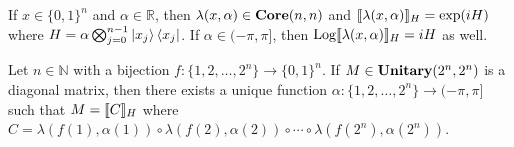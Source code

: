 \begin{theorem}
    \label{Thm:LambdaSem}
    If $x \in \{ 0, 1 \}^n$ and $\alpha \in \mathbb{R}$, then $\lambda( x, \alpha ) \in \mathbf{Core}( n,n )$ and $\llbracket\lambda( x, \alpha )\rrbracket_H = \exp( iH )$ where $H = \alpha \bigotimes_{j=0}^{n-1} \ket{x_j} \bra{x_j}$.
    If $\alpha \in ( -\pi, \pi ]$, then $\operatorname{Log}\llbracket\lambda( x, \alpha )\rrbracket_H = iH$ as well.
\end{theorem}

\begin{corollary}
    \label{Cor:Diag}
    Let $n \in \mathbb{N}$ with a bijection $f: \{ 1, 2, \ldots, 2^n \} \to \{ 0, 1 \}^n$.
    If $M \in \mathbf{Unitary}( 2^n, 2^n )$ is a diagonal matrix, then there exists a unique function $\alpha: \{ 1, 2, \ldots, 2^n \} \to ( -\pi, \pi ]$ such that $M = \llbracket C\rrbracket_H$ where $C = \lambda( f( 1 ), \alpha( 1 ) ) \circ \lambda( f( 2 ), \alpha( 2 ) ) \circ \cdots \circ \lambda( f( 2^n ), \alpha( 2^n ) )$.
\end{corollary}

